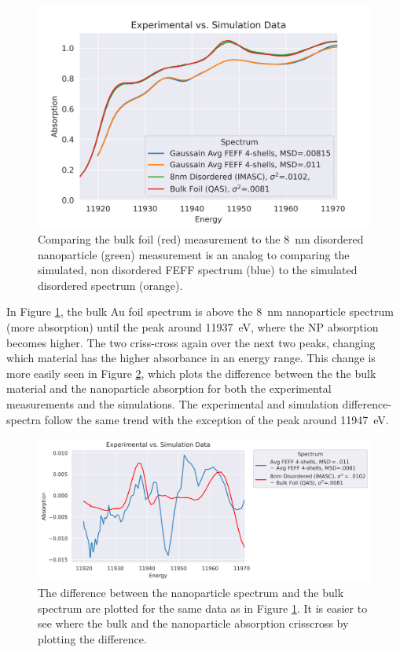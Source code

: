 \begin{figure}[h]
	\centering
	\includegraphics[width=.75\linewidth]{Chapters/Figures/updated_bulk_8nm_disorder_experimental_theory_comparison.png}
	\caption[Simulation vs. Experimental]{Comparing the bulk foil (red) measurement to the 8~nm disordered nanoparticle (green) measurement is an analog to comparing the simulated, non disordered FEFF spectrum (blue) to the simulated disordered spectrum (orange).}
	\label{fig:avg-experimental-vs-simulation}
\end{figure}

In Figure \ref{fig:avg-experimental-vs-simulation}, the bulk Au foil spectrum is above the 8~nm nanoparticle spectrum (more absorption) until the peak around 11937~eV, where the NP absorption becomes higher. The two criss-cross again over the next two peaks, changing which material has the higher absorbance in an energy range. This change is more easily seen in Figure \ref{fig:avg-experimential-vs-simulation-difference}, which plots the difference between the the bulk material and the nanoparticle absorption for both the experimental measurements and the simulations. The experimental and simulation difference-spectra follow the same trend with the exception of the peak around 11947~eV.


\begin{figure}[h!]
	\centering
	\includegraphics[width=\linewidth]{Chapters/Figures/experimental_vs_simulation_delta.png}
	\caption[Bulk-nanoparticle difference: Simulation vs. Experimental data]{The difference between the nanoparticle spectrum and the bulk spectrum are plotted for the same data as in Figure \ref{fig:avg-experimental-vs-simulation}. It is easier to see where the bulk and the nanoparticle absorption crisscross by plotting the difference.}
	\label{fig:avg-experimential-vs-simulation-difference}
\end{figure}

